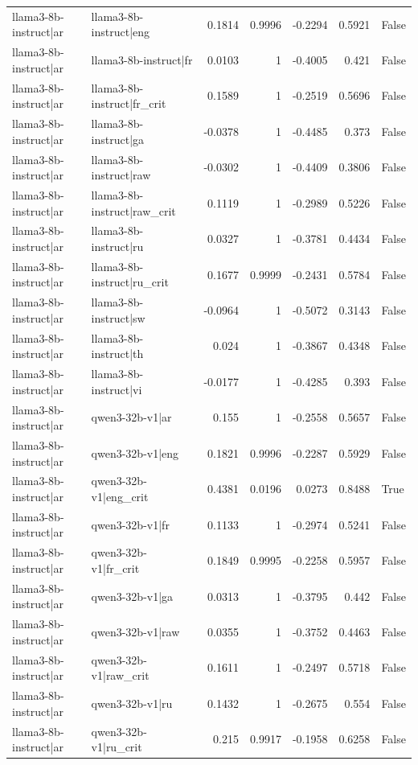 \begin{table}
\begin{tabular}{l l r r r r l}
llama3-8b-instruct|ar & llama3-8b-instruct|eng & 0.1814 & 0.9996 & -0.2294 & 0.5921 & False \\
llama3-8b-instruct|ar & llama3-8b-instruct|fr & 0.0103 & 1 & -0.4005 & 0.421 & False \\
llama3-8b-instruct|ar & llama3-8b-instruct|fr_crit & 0.1589 & 1 & -0.2519 & 0.5696 & False \\
llama3-8b-instruct|ar & llama3-8b-instruct|ga & -0.0378 & 1 & -0.4485 & 0.373 & False \\
llama3-8b-instruct|ar & llama3-8b-instruct|raw & -0.0302 & 1 & -0.4409 & 0.3806 & False \\
llama3-8b-instruct|ar & llama3-8b-instruct|raw_crit & 0.1119 & 1 & -0.2989 & 0.5226 & False \\
llama3-8b-instruct|ar & llama3-8b-instruct|ru & 0.0327 & 1 & -0.3781 & 0.4434 & False \\
llama3-8b-instruct|ar & llama3-8b-instruct|ru_crit & 0.1677 & 0.9999 & -0.2431 & 0.5784 & False \\
llama3-8b-instruct|ar & llama3-8b-instruct|sw & -0.0964 & 1 & -0.5072 & 0.3143 & False \\
llama3-8b-instruct|ar & llama3-8b-instruct|th & 0.024 & 1 & -0.3867 & 0.4348 & False \\
llama3-8b-instruct|ar & llama3-8b-instruct|vi & -0.0177 & 1 & -0.4285 & 0.393 & False \\
llama3-8b-instruct|ar & qwen3-32b-v1|ar & 0.155 & 1 & -0.2558 & 0.5657 & False \\
llama3-8b-instruct|ar & qwen3-32b-v1|eng & 0.1821 & 0.9996 & -0.2287 & 0.5929 & False \\
llama3-8b-instruct|ar & qwen3-32b-v1|eng_crit & 0.4381 & 0.0196 & 0.0273 & 0.8488 & True \\
llama3-8b-instruct|ar & qwen3-32b-v1|fr & 0.1133 & 1 & -0.2974 & 0.5241 & False \\
llama3-8b-instruct|ar & qwen3-32b-v1|fr_crit & 0.1849 & 0.9995 & -0.2258 & 0.5957 & False \\
llama3-8b-instruct|ar & qwen3-32b-v1|ga & 0.0313 & 1 & -0.3795 & 0.442 & False \\
llama3-8b-instruct|ar & qwen3-32b-v1|raw & 0.0355 & 1 & -0.3752 & 0.4463 & False \\
llama3-8b-instruct|ar & qwen3-32b-v1|raw_crit & 0.1611 & 1 & -0.2497 & 0.5718 & False \\
llama3-8b-instruct|ar & qwen3-32b-v1|ru & 0.1432 & 1 & -0.2675 & 0.554 & False \\
llama3-8b-instruct|ar & qwen3-32b-v1|ru_crit & 0.215 & 0.9917 & -0.1958 & 0.6258 & False \\

\end{tabular}
\end{table}
